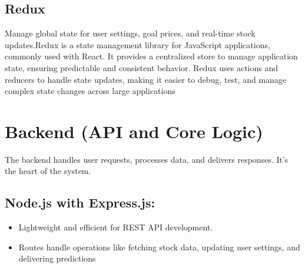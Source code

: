 \subsection{Redux }
Manage global state for user settings, goal prices, and real-time stock updates.Redux is a state management library for JavaScript applications, commonly used with React. It provides a centralized store to manage application state, ensuring predictable and consistent behavior. Redux uses actions and reducers to handle state updates, making it easier to debug, test, and manage complex state changes across large applications
\section{Backend (API and Core Logic)}
The backend handles user requests, processes data, and delivers responses. It’s the heart of the system.
\subsection{Node.js with Express.js:}
\begin{itemize}


    \item Lightweight and efficient for REST API development.
    \item Routes handle operations like fetching stock data, updating user settings, and delivering predictions
\end{itemize}
